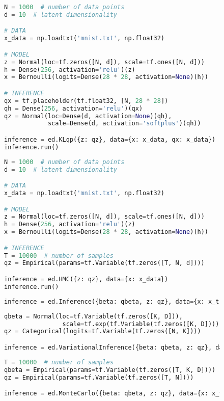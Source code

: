 \documentclass{article} %
\begin{document}
\begin{figure}[t]
\centering
\begin{lstlisting}[language=python]
N = 1000  # number of data points
d = 10  # latent dimensionality

# DATA
x_data = np.loadtxt('mnist.txt', np.float32)

# MODEL
z = Normal(loc=tf.zeros([N, d]), scale=tf.ones([N, d]))
h = Dense(256, activation='relu')(z)
x = Bernoulli(logits=Dense(28 * 28, activation=None)(h))

# INFERENCE
qx = tf.placeholder(tf.float32, [N, 28 * 28])
qh = Dense(256, activation='relu')(qx)
qz = Normal(loc=Dense(d, activation=None)(qh),
            scale=Dense(d, activation='softplus')(qh))

inference = ed.KLqp({z: qz}, data={x: x_data, qx: x_data})
inference.run()
\end{lstlisting}

\begin{lstlisting}[language=python]
N = 1000  # number of data points
d = 10  # latent dimensionality

# DATA
x_data = np.loadtxt('mnist.txt', np.float32)

# MODEL
z = Normal(loc=tf.zeros([N, d]), scale=tf.ones([N, d]))
h = Dense(256, activation='relu')(z)
x = Bernoulli(logits=Dense(28 * 28, activation=None)(h))

# INFERENCE
T = 10000  # number of samples
qz = Empirical(params=tf.Variable(tf.zeros([T, N, d])))

inference = ed.HMC({z: qz}, data={x: x_data})
inference.run()
\end{lstlisting}
\caption{}
\end{figure}

\begin{figure}[t]
\begin{lstlisting}[language=python]
inference = ed.Inference({beta: qbeta, z: qz}, data={x: x_train})
\end{lstlisting}

\begin{lstlisting}[language=Python]
qbeta = Normal(loc=tf.Variable(tf.zeros([K, D])),
                scale=tf.exp(tf.Variable(tf.zeros([K, D]))))
qz = Categorical(logits=tf.Variable(tf.zeros([N, K])))

inference = ed.VariationalInference({beta: qbeta, z: qz}, data={x: x_train})
\end{lstlisting}

\begin{lstlisting}[language=Python]
T = 10000  # number of samples
qbeta = Empirical(params=tf.Variable(tf.zeros([T, K, D])))
qz = Empirical(params=tf.Variable(tf.zeros([T, N])))

inference = ed.MonteCarlo({beta: qbeta, z: qz}, data={x: x_train})
\end{lstlisting}
\caption{}
\end{figure}
\end{document}
